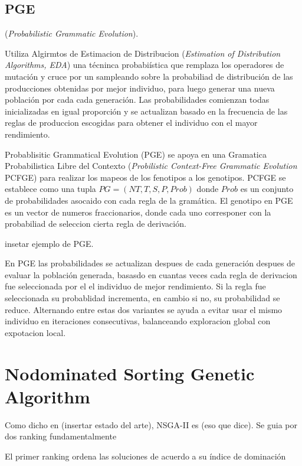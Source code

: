 \subsection{PGE}
 (\textit{Probabilistic Grammatic Evolution}).


Utiliza Algirmtos de Estimacion de Distribucion (\textit{Estimation of Distribution Algorithms, EDA}) una t\'ecninca probabi\'istica que remplaza los operadores de mutaci\'on y cruce por un sampleando sobre la probabiliad de distribuci\'on de las producciones obtenidas por mejor individuo, para luego generar una nueva poblaci\'on por cada cada generaci\'on. Las probabilidades comienzan todas inicializadas en igual proporci\'on  y se actualizan basado en la frecuencia de las reglas de produccion escogidas para obtener el individuo con el mayor rendimiento.

Probablisitic Grammatical Evolution (PGE)  se apoya en una Gramatica Probabilistica Libre del Contexto (\textit{Probilistic Context-Free Grammatic Evolution} PCFGE) para realizar los mapeos de los fenotipos a los genotipos. PCFGE se establece como una tupla $PG = (NT, T, S, P, Prob)$ donde $Prob$  es un conjunto de probabilidades asocaido con cada regla de la gram\'atica. El genotipo en PGE es un vector de numeros fraccionarios, donde cada uno corresponer con la probabiliad de seleccion cierta regla de derivaci\'on.

insetar ejemplo de PGE.

En PGE las probabilidades se actualizan despues de cada generaci\'on  despues de evaluar la poblaci\'on generada, basasdo en cuantas veces cada regla de derivacion fue seleccionada por el el individuo de mejor rendimiento. Si la regla fue seleccionada su probablidad incrementa, en cambio si no, su probabilidad se reduce. Alternando entre estas dos variantes se ayuda a evitar usar el mismo individuo en iteraciones consecutivas, balanceando exploracion global con expotacion local.

\section{Nodominated Sorting Genetic Algorithm}

Como dicho en (insertar estado del arte), NSGA-II es (eso que dice). Se guia por dos ranking fundamentalmente

El primer ranking ordena las soluciones de acuerdo a su \'indice de dominaci\'on

